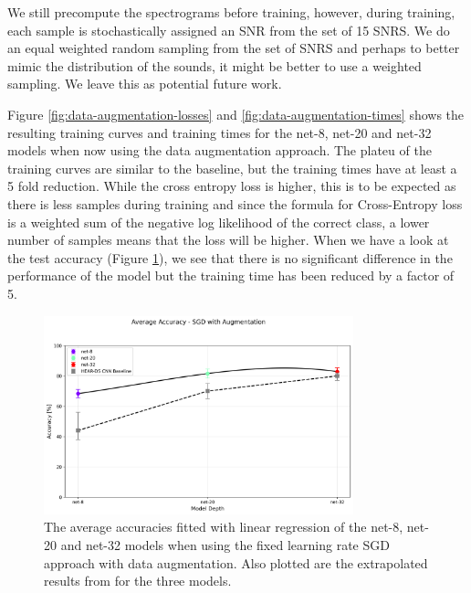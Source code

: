 \documentclass[logo,bsc,singlespacing,parskip,online]{infthesis}
\begin{document}
We still precompute the spectrograms before training, however, during 
training, each sample is stochastically assigned an SNR from the set of 
15 SNRS. We do an equal weighted random sampling from the set of SNRS 
and perhaps to better mimic the distribution of the sounds, it might 
be better to use a weighted sampling. We leave this as 
potential future work.

Figure \ref{fig:data-augmentation-losses} and \ref{fig:data-augmentation-times} shows 
the resulting training curves and training times for the net-8, net-20 and net-32 models
when now using the data augmentation approach. The plateu of the training curves 
are similar to the baseline, but the training times have at least 
a 5 fold reduction. While the cross entropy loss is higher, this is 
to be expected as there is less samples during training and since the formula for 
Cross-Entropy loss is a weighted sum of the negative log likelihood of 
the correct class, a lower number of samples means that the loss 
will be higher. When we have a look at the test accuracy (Figure \ref{fig:data-augmentation-accuracies}),
we see that there is no significant difference in the performance of the model 
but the training time has been reduced by a factor of 5.

\begin{figure}[h]
   \centering
   \includegraphics[width=0.8\textwidth]{average_accuracies_sgd_aug.png}
   \caption{The average accuracies fitted with linear regression of the net-8, net-20 and net-32 models when using the fixed learning rate SGD approach with data augmentation.
   Also plotted are the extrapolated results from \citet{Huwel2020HearDS} for the three models.
   }
   \label{fig:data-augmentation-accuracies}
\end{figure}
\end{document}
